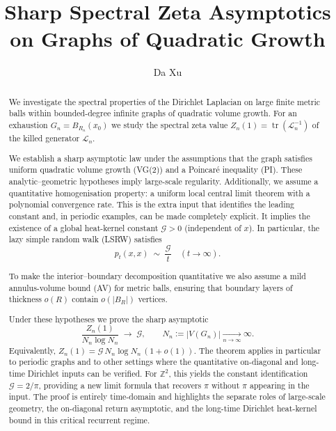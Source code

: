 \documentclass[reqno]{amsart}
\numberwithin{equation}{section}
\theoremstyle{definition}
\theoremstyle{remark}
\newcommand{\cG}{\mathcal{G}}
\DeclareMathOperator{\tr}{tr}
\newcommand{\LL}{\mathcal{L}}
\begin{document}
\title{Sharp Spectral Zeta Asymptotics on Graphs of Quadratic Growth}
\author{Da Xu}
\address{China Mobile Research Institute, Beijing, P.R.~China}
\date{}

\begin{abstract}
We investigate the spectral properties of the Dirichlet Laplacian on large finite metric balls within bounded-degree infinite graphs of quadratic volume growth.
For an exhaustion $G_n=B_{R_n}(x_0)$ we study the spectral zeta value
$Z_n(1)=\tr(\LL_n^{-1})$ of the killed generator $\LL_n$.

We establish a sharp asymptotic law under the assumptions that the graph satisfies uniform quadratic volume growth (VG(2)) and a Poincaré inequality (PI). These analytic–geometric hypotheses imply large-scale regularity. Additionally, we assume a quantitative homogenisation property: a uniform local central limit theorem with a polynomial convergence rate. This is the extra input that identifies the leading constant and, in periodic examples, can be made completely explicit. It implies the existence of a global heat-kernel constant $\cG>0$ (independent of $x$). In particular, the lazy simple random walk (LSRW) satisfies
\[
  p_t(x,x)\;\sim\;\frac{\cG}{t}\quad(t\to\infty).
\]

To make the interior--boundary decomposition quantitative we also assume a mild annulus-volume bound (AV) for metric balls, ensuring that boundary layers of thickness $o(R)$ contain $o(|B_R|)$ vertices.

Under these hypotheses we prove the sharp asymptotic
\[
  \frac{Z_n(1)}{N_n\log N_n}\;\longrightarrow\;\cG,\qquad N_n:=|V(G_n)|\xrightarrow[n\to\infty]{}\infty.
\]
Equivalently, $Z_n(1)=\cG\,N_n\log N_n\,(1+o(1))$.
The theorem applies in particular to periodic graphs and to other settings where the quantitative on-diagonal and long-time Dirichlet inputs can be verified.
For $\mathbb Z^2$, this yields the constant identification $\cG = 2/\pi$, providing a new limit formula that recovers $\pi$ without $\pi$ appearing in the input.
The proof is entirely time-domain and highlights the separate roles of large-scale geometry, the on-diagonal return asymptotic, and the long-time Dirichlet heat-kernel bound in this critical recurrent regime.
\end{abstract}
\end{document}
